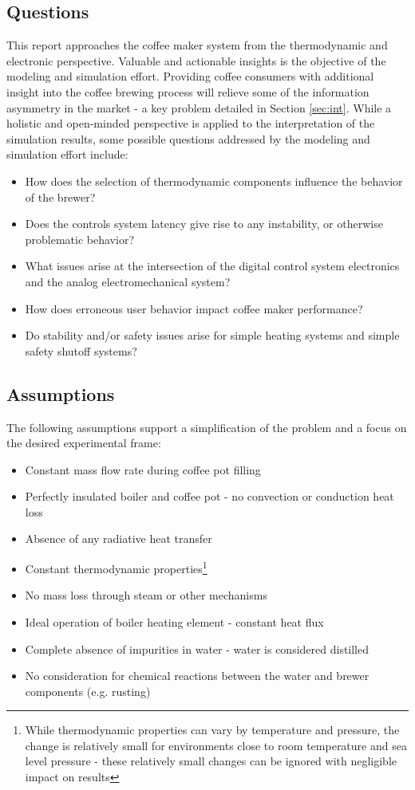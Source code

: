 \documentclass[10pt]{article}
\begin{document}
\subsection{Questions}
This report approaches the coffee maker system from the thermodynamic and electronic perspective.  Valuable and actionable insights is the objective of the modeling and simulation effort.  Providing coffee consumers with additional insight into the coffee brewing process will relieve some of the information asymmetry in the market - a key problem detailed in Section \ref{sec:int}.  While a holistic and open-minded perspective is applied to the interpretation of the simulation results, some possible questions addressed by the modeling and simulation effort include:
\begin{itemize}
\item How does the selection of thermodynamic components influence the behavior of the brewer?
\item Does the controls system latency give rise to any instability, or otherwise problematic behavior?
\item What issues arise at the intersection of the digital control system electronics and the analog electromechanical system?
\item How does erroneous user behavior impact coffee maker performance?
\item Do stability and/or safety issues arise for simple heating systems and simple safety shutoff systems?
\end{itemize}

\subsection{Assumptions}
\label{sec:ass}

The following assumptions support a simplification of the problem and a focus on the desired experimental frame:
\begin{itemize}
\item Constant mass flow rate during coffee pot filling
\item Perfectly insulated boiler and coffee pot - no convection or conduction heat loss
\item Absence of any radiative heat transfer
\item Constant thermodynamic properties\footnote{While thermodynamic properties can vary by temperature and pressure, the change is relatively small for environments close to room temperature and sea level pressure - these relatively small changes can be ignored with negligible impact on results}
\item No mass loss through steam or other mechanisms
\item Ideal operation of boiler heating element - constant heat flux
\item Complete absence of impurities in water - water is considered distilled
\item No consideration for chemical reactions between the water and brewer components (e.g. rusting)
\end{itemize}
\end{document}
